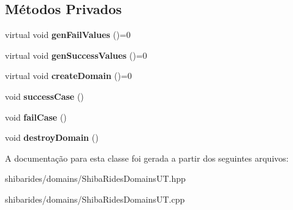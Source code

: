 \subsection*{Métodos Privados}
\begin{DoxyCompactItemize}
\item 
virtual void {\bfseries gen\+Fail\+Values} ()=0\hypertarget{classshibarides_1_1TUDominio_aacb5fcdd84fa980f887769daab4565bc}{}\label{classshibarides_1_1TUDominio_aacb5fcdd84fa980f887769daab4565bc}

\item 
virtual void {\bfseries gen\+Success\+Values} ()=0\hypertarget{classshibarides_1_1TUDominio_a1feb01f87ed74028d29ef2299d4888d9}{}\label{classshibarides_1_1TUDominio_a1feb01f87ed74028d29ef2299d4888d9}

\item 
virtual void {\bfseries create\+Domain} ()=0\hypertarget{classshibarides_1_1TUDominio_af0be8e7153952da7f3abb099fdc404f7}{}\label{classshibarides_1_1TUDominio_af0be8e7153952da7f3abb099fdc404f7}

\item 
void {\bfseries success\+Case} ()\hypertarget{classshibarides_1_1TUDominio_ad4afb45fca447ea713c718fa36d4f5a1}{}\label{classshibarides_1_1TUDominio_ad4afb45fca447ea713c718fa36d4f5a1}

\item 
void {\bfseries fail\+Case} ()\hypertarget{classshibarides_1_1TUDominio_a6a441b2075e00ebf26aa644a76ec793f}{}\label{classshibarides_1_1TUDominio_a6a441b2075e00ebf26aa644a76ec793f}

\item 
void {\bfseries destroy\+Domain} ()\hypertarget{classshibarides_1_1TUDominio_a1a8e0db37850502e9461d252a91d8331}{}\label{classshibarides_1_1TUDominio_a1a8e0db37850502e9461d252a91d8331}

\end{DoxyCompactItemize}


A documentação para esta classe foi gerada a partir dos seguintes arquivos\+:\begin{DoxyCompactItemize}
\item 
shibarides/domains/Shiba\+Rides\+Domains\+U\+T.\+hpp\item 
shibarides/domains/Shiba\+Rides\+Domains\+U\+T.\+cpp\end{DoxyCompactItemize}
